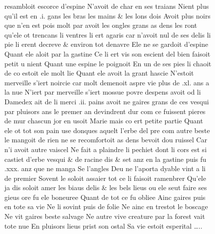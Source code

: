 \documentclass[
  letterpaper,
  DIV=11,
  numbers=noendperiod,
  oneside]{scrreprt}
\begin{document}
\begin{figure}
resambloit escorce d'espine N'avoit de char en ses traians Nient plus
qu'il est en .i. gans les bras les mains \& les lons dois Avoit plus
noirs que n'en est pois molt par avoit les ongles grans as dens les ront
qu'ele ot trencans li ventres li ert agaris car n'avoit nul de ses delis
li pie li erent decreve \& environ tot denavre Ele ne se gardoit
d'espine Quant ele aloit par la gastine Ce li ert vis son escient del
bien faisoit petit u nient Quant une espine le poignoit En un de ses
pies li chaoit de co estoit ele molt lie Quant ele avoit la grant hascie
N'estoit merveille s'iert noircie car molt demenoit aspre vie plus de
.xl. ans a la nue N'iert par merveille s'iert mossue povre despens avoit
od li Damedex ait de li merci .ii. pains avoit ne gaires grans de ces
vesqui par pluisors ans le premer an devindrent dur com ce fuissent
pieres de mur chascun jor en usoit Marie mais co ert petite partie Quant
ele ot tot son pain use donques aquelt l'erbe del pre com autre beste le
mangoit de rien ne se recomfortoit as dens bevoit dou ruissel Car n'i
avoit autre vaiscel Ne fait a plaindre li pechiet dont li cors est si
castiet d'erbe vesqui \& de racine dis \& set anz en la gastine puis fu
.xxx. anz que ne manga Se l'angles Deu ne l'aporta dyable vint a li de
premier Sovent le soloit assaier tot ce li faisoit ramenbrer Qu'ele ja
dis soloit amer les biaus delis \& les bels lieus ou ele seut faire ses
gieus ore fu ele boneuree Quant de tot ce fu obliee Ainc gaires puis en
tote sa vie Ne li sovint puis de folie Ne ainc en trestot le boscage Ne
vit gaires beste salvage Ne autre vive creature par la forest vait tote
nue En pluisors lieus prist son ostal Sa vie estoit esperital \ldots..


\end{figure}
\end{document}
